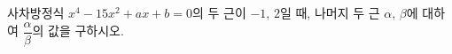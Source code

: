 사차방정식 $x^4-15x^2+ax+b=0$의 두 근이 $-1$, $2$일 때, 나머지 두 근 $\alpha$, $\beta$에 대하여 $\dfrac{\alpha}{\beta}$의 값을 구하시오. 
